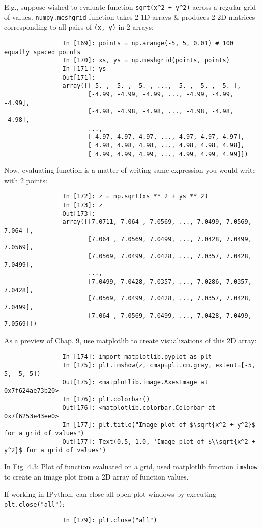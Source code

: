 \documentclass{article}
\begin{document}
\begin{enumerate}
\begin{itemize}
\begin{itemize}
			E.g., suppose wished to evaluate function \verb|sqrt(x^2 + y^2)| across a regular grid of values. {\tt numpy.meshgrid} function takes 2 1D arrays \& produces 2 2D matrices corresponding to all pairs of {\tt(x, y)} in 2 arrays:
			\begin{verbatim}
				In [169]: points = np.arange(-5, 5, 0.01) # 100 equally spaced points
				In [170]: xs, ys = np.meshgrid(points, points)
				In [171]: ys
				Out[171]:
				array([[-5. , -5. , -5. , ..., -5. , -5. , -5. ],
				       [-4.99, -4.99, -4.99, ..., -4.99, -4.99, -4.99],
				       [-4.98, -4.98, -4.98, ..., -4.98, -4.98, -4.98],
				       ...,
				       [ 4.97, 4.97, 4.97, ..., 4.97, 4.97, 4.97],
				       [ 4.98, 4.98, 4.98, ..., 4.98, 4.98, 4.98],
				       [ 4.99, 4.99, 4.99, ..., 4.99, 4.99, 4.99]])
			\end{verbatim}
			Now, evaluating function is a matter of writing same expression you would write with 2 points:
			\begin{verbatim}
				In [172]: z = np.sqrt(xs ** 2 + ys ** 2)
				In [173]: z
				Out[173]:
				array([[7.0711, 7.064 , 7.0569, ..., 7.0499, 7.0569, 7.064 ],
				       [7.064 , 7.0569, 7.0499, ..., 7.0428, 7.0499, 7.0569],
				       [7.0569, 7.0499, 7.0428, ..., 7.0357, 7.0428, 7.0499],
				       ...,
				       [7.0499, 7.0428, 7.0357, ..., 7.0286, 7.0357, 7.0428],
				       [7.0569, 7.0499, 7.0428, ..., 7.0357, 7.0428, 7.0499],
				       [7.064 , 7.0569, 7.0499, ..., 7.0428, 7.0499, 7.0569]])
			\end{verbatim}
			As a preview of Chap. 9, use matplotlib to create visualizations of this 2D array:
			\begin{verbatim}
				In [174]: import matplotlib.pyplot as plt
				In [175]: plt.imshow(z, cmap=plt.cm.gray, extent=[-5, 5, -5, 5])
				Out[175]: <matplotlib.image.AxesImage at 0x7f624ae73b20>
				In [176]: plt.colorbar()
				Out[176]: <matplotlib.colorbar.Colorbar at 0x7f6253e43ee0>
				In [177]: plt.title("Image plot of $\sqrt{x^2 + y^2}$ for a grid of values")
				Out[177]: Text(0.5, 1.0, 'Image plot of $\\sqrt{x^2 + y^2}$ for a grid of values')
			\end{verbatim}
			In {\sf Fig. 4.3: Plot of function evaluated on a grid}, used matplotlib function {\tt imshow} to create an image plot from a 2D array of function values.
			
			If working in IPython, can close all open plot windows by executing {\tt plt.close("all")}:
			\begin{verbatim}
				In [179]: plt.close("all")
			\end{verbatim}
			

\end{itemize}
\end{itemize}
\end{enumerate}
\end{document}
